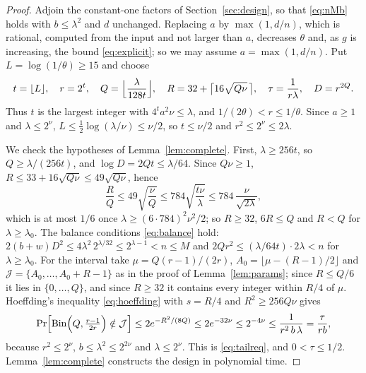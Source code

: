 \begin{proof}
Adjoin the constant-one factors of Section~\ref{sec:design}, so that
\eqref{eq:nMb} holds with $b\le\lambda^2$ and $d$ unchanged. Replacing $a$ by
$\max(1,d/n)$, which is rational, computed from the input and not larger than $a$,
decreases $\theta$ and, as $g$ is increasing, the bound \eqref{eq:explicit}; so we
may assume $a=\max(1,d/n)$. Put
$L=\log(1/\theta)\ge15$ and choose
\[
  t=\lfloor L\rfloor,\quad r=2^{t},\quad Q=\Bigl\lfloor\frac{\lambda}{128t}\Bigr\rfloor,\quad
  R=32+\bigl\lceil16\sqrt{Q\nu}\,\bigr\rceil,\quad \tau=\frac1{r\lambda},\quad D=r^{2Q}.
\]
Thus $t$ is the largest integer with $4^ta^2\nu\le\lambda$, and $1/(2\theta)<r\le1/\theta$.
Since $a\ge1$ and $\lambda\le2^{\nu}$, $L\le\frac12\log(\lambda/\nu)\le\nu/2$, so
$t\le\nu/2$ and $r^2\le2^{\nu}\le2\lambda$.

We check the hypotheses of Lemma~\ref{lem:complete}. First, $\lambda\ge256t$, so
$Q\ge\lambda/(256t)$, and $\log D=2Qt\le\lambda/64$. Since $Q\nu\ge1$,
$R\le33+16\sqrt{Q\nu}\le49\sqrt{Q\nu}$, hence
\begin{equation}\label{eq:RQexplicit}
  \frac RQ\le49\sqrt{\frac\nu Q}\le784\sqrt{\frac{t\nu}{\lambda}}
  \le784\,\frac{\nu}{\sqrt{2\lambda}} ,
\end{equation}
which is at most $1/6$ once $\lambda\ge(6\cdot784)^2\nu^2/2$; so $R\ge32$, $6R\le Q$
and $R<Q$ for $\lambda\ge\lambda_0$. The balance conditions \eqref{eq:balance}
hold: $2(b+w)D^2\le4\lambda^2\,2^{\lambda/32}\le2^{\lambda-1}<n\le M$ and
$2Qr^2\le(\lambda/64t)\cdot2\lambda<n$ for $\lambda\ge\lambda_0$. For the interval
take $\mu=Q(r-1)/(2r)$, $A_0=\lfloor\mu-(R-1)/2\rfloor$ and
$\mathcal J=\{A_0,\dots,A_0+R-1\}$ as in the proof of Lemma~\ref{lem:params}; since
$R\le Q/6$ it lies in $\{0,\dots,Q\}$, and since $R\ge32$ it contains every integer
within $R/4$ of $\mu$. Hoeffding's inequality \eqref{eq:hoeffding} with $s=R/4$
and $R^2\ge256Q\nu$ gives
\[
  \Pr\Bigl[\operatorname{Bin}\Bigl(Q,\tfrac{r-1}{2r}\Bigr)\notin\mathcal J\Bigr]\le2e^{-R^2/(8Q)}
  \le2e^{-32\nu}\le2^{-4\nu}\le\frac1{r^2\,b\,\lambda}=\frac{\tau}{rb},
\]
because $r^2\le2^{\nu}$, $b\le\lambda^2\le2^{2\nu}$ and $\lambda\le2^{\nu}$. This is
\eqref{eq:tailreq}, and $0<\tau\le1/2$. Lemma~\ref{lem:complete} constructs the
design in polynomial time.


\end{proof}

